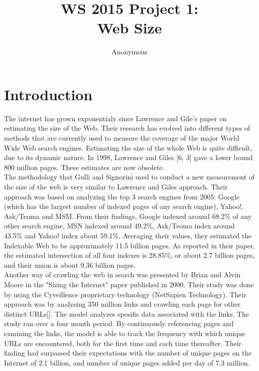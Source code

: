 \documentclass{sig-alternate}
\begin{document}
\title{WS 2015 Project 1:\\Web Size}
\author{
\alignauthor 
Anonymous
}
\maketitle



\section{Introduction}
The internet has grown exponentialy since Lawrence and Gile's paper on estimating the size of the Web. Their research has evolved into different types of methods that are currently used to measure the coverage of the major World Wide Web search engines. Estimating the size of the whole Web is quite difficult, due to its dynamic nature. In 1998, Lawrence and Giles [6, 3] gave a lower bound 800 million pages. These estimates are now obsolete.\\

The methodology that Gulli and Signorini used to conduct a new measurement of the size of the web is very similar to Lawrence and Giles approach. Their approach was based on analyzing the top 3 search engines from 2005: Google (which has the largest number of indexed pages of any search engine), Yahoo!, Ask/Teoma and MSM. From their findings, Google indexed around 68.2\% of any other search engine, MSN indexed around 49.2\%, Ask/Teoma index around 43.5\% and Yahoo! index about 59.1\%. Averaging their values, they estimated the Indexable Web to be approximately 11.5 billion pages. As reported in their paper, the estimated intersection of all four indexes is 28.85\%, or about 2.7 billion pages, and their union is about 9.36 billion pages. \\

Another way of crawling the web in search was presented by Brian and Alvin Moore in the "Sizing the Internet" paper published in 2000. Their study was done by using the Cyveillence proprietary technology (NetSapien Technology). Their approach was by analysing 350 million links and crawling each page for other distinct URLs[]. The model analyzes spesific data associated with the links. The study ran over a four month period. By continuously referencing pages and exmining the links, the model is able to track the frequency with which unique URLs are encountered, both for the first time and each time thereafter. Their finding had surpassed their expectations with the number of unique pages on the Internet of 2.1 billion, and number of unique pages added per day of 7.3 million.\\
\end{document}
